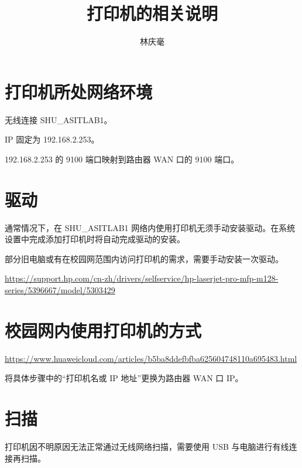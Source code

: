 \documentclass{article}
\begin{document}
\author{林庆毫}
\title{打印机的相关说明}
\maketitle
\tableofcontents
\newpage
{}

\section{打印机所处网络环境}
无线连接 SHU\_ASITLAB1。

IP 固定为 192.168.2.253。

192.168.2.253 的 9100 端口映射到路由器 WAN 口的 9100 端口。

\section{驱动}
通常情况下，在 SHU\_ASITLAB1 网络内使用打印机无须手动安装驱动。在系统设置中完成添加打印机时将自动完成驱动的安装。

部分旧电脑或有在校园网范围内访问打印机的需求，需要手动安装一次驱动。

\url{https://support.hp.com/cn-zh/drivers/selfservice/hp-laserjet-pro-mfp-m128-series/5396667/model/5303429}

\section{校园网内使用打印机的方式}
\url{https://www.huaweicloud.com/articles/b5ba8ddefbfba625604748110a695483.html}

将具体步骤中的“打印机名或 IP 地址”更换为路由器 WAN 口 IP。

\section{扫描}
打印机因不明原因无法正常通过无线网络扫描，需要使用 USB 与电脑进行有线连接再扫描。
\end{document}

